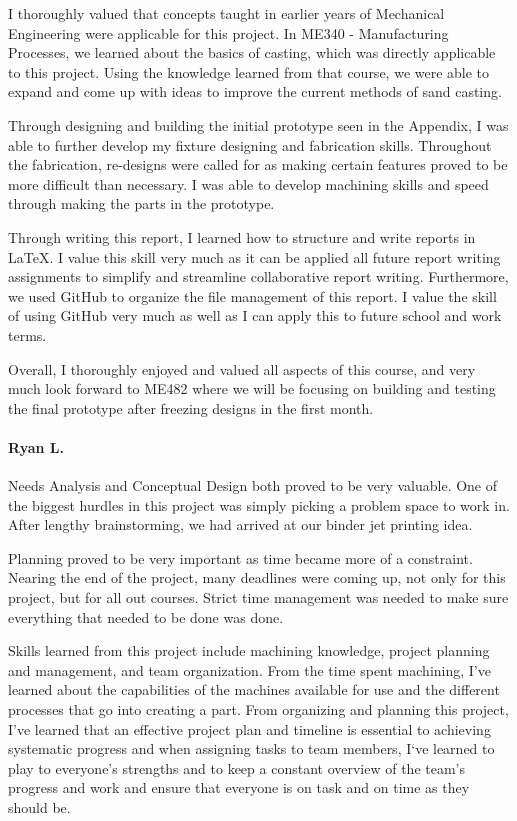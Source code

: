 \documentclass[11pt]{article}
\begin{document}
\begin{appendices}
I thoroughly valued that concepts taught in earlier years of Mechanical Engineering were applicable for this project. In ME340 - Manufacturing Processes, we learned about the basics of casting, which was directly applicable to this project. Using the knowledge learned from that course, we were able to expand and come up with ideas to improve the current methods of sand casting.

Through designing and building the initial prototype seen in the Appendix, I was able to further develop my fixture designing and fabrication skills. Throughout the fabrication, re-designs were called for as making certain features proved to be more difficult than necessary. I was able to develop machining skills and speed through making the parts in the prototype.

Through writing this report, I learned how to structure and write reports in \LaTeX. I value this skill very much as it can be applied all future report writing assignments to simplify and streamline collaborative report writing. Furthermore, we used GitHub to organize the file management of this report. I value the skill of using GitHub very much as well as I can apply this to future school and work terms.

Overall, I thoroughly enjoyed and valued all aspects of this course, and very much look forward to ME482 where we will be focusing on building and testing the final prototype after freezing designs in the first month.

\newpage
\paragraph*{Ryan L.}
Needs Analysis and Conceptual Design both proved to be very valuable. One of the biggest hurdles in this project was simply picking a problem space to work in. After lengthy brainstorming, we had arrived at our binder jet printing idea. 

	Planning proved to be very important as time became more of a constraint. Nearing the end of the project, many deadlines were coming up, not only for this project, but for all out courses. Strict time management was needed to make sure everything that needed to be done was done.

	Skills learned from this project include machining knowledge, project planning and management, and team organization. From the time spent machining, I’ve learned about the capabilities of the machines available for use and the different processes that go into creating a part. From organizing and planning this project, I’ve learned that an effective project plan and timeline is essential to achieving systematic progress and when assigning tasks to team members, I‘ve learned to play to everyone’s strengths and to keep a constant overview of the team’s progress and work and ensure that everyone is on task and on time as they should be.


\end{appendices}
\end{document}

